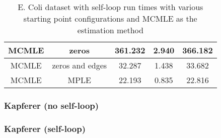 \begin{table}[!ht]
\centering
\begin{tabular}{||c | c | c | c | c||}
 \hline
 MCMLE & zeros & 361.232 & 2.940 & 366.182 \\  
 \hline
 MCMLE & zeros and edges & 32.287 & 1.438 & 33.682 \\ 
 \hline
 MCMLE & MPLE & 22.193 & 0.835 & 22.816 \\  
 \hline
\end{tabular}
\label{t:ecoli2}
\caption{E. Coli dataset with self-loop run times with various starting point configurations and MCMLE as the estimation method}
\end{table}

\subsubsection{Kapferer (no self-loop)}



\subsubsection{Kapferer (self-loop)}



